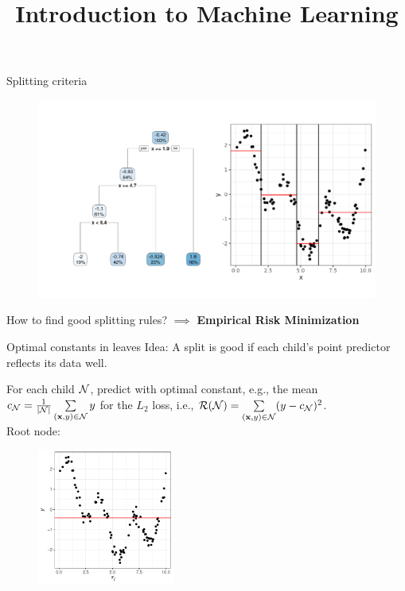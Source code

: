 \documentclass[11pt,compress,t,notes=noshow, xcolor=table]{beamer}
\title{Introduction to Machine Learning}
\institute{\href{https://compstat-lmu.github.io/lecture_i2ml/}{compstat-lmu.github.io/lecture\_i2ml}}
\date{}
\begin{document}
\sloppy


\begin{frame}{Splitting criteria}

 \begin{figure}
    \centering
      \includegraphics[width=\textwidth]{figure/tree-regr-depth3.pdf} %
    \end{figure}

How to find good splitting rules? $\implies$ \textbf{Empirical Risk Minimization}

\end{frame}

\begin{vbframe}{Optimal constants in leaves}
Idea: A split is good if each child's point predictor reflects its data well. %
\vspace{0.2cm}

For each child $\mathcal{N}$, predict with optimal constant, e.g., the mean $c_{\mathcal{N}} = \frac{1}{|\mathcal{N}|}\sum\limits_{(\mathbf{x}, y) \in \mathcal{N}} y$ for the $L_2$ loss, i.e., $\mathcal{R}(\mathcal{N}) = \sum\limits_{(\mathbf{x}, y) \in \mathcal{N}} (y - c_{\mathcal{N}})^2$.\\

Root node:

\begin{figure}
\includegraphics[width=0.4\textwidth]{figure/splitcrit_optimal-constant.pdf} 
\end{figure}



\end{vbframe}
\end{document}
